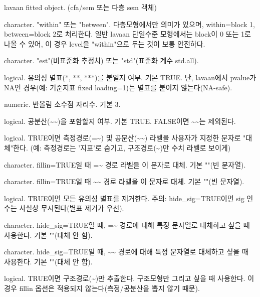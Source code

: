\documentclass[a4paper]{book}
\begin{document}
\begin{Arguments}
\begin{ldescription}
\item[\code{obj}] lavaan fitted object. (cfa/sem 또는 다층 sem 객체)

\item[\code{level}] character. "within" 또는 "between".
다층모형에서만 의미가 있으며, within=block 1, between=block 2로 처리한다.
일반 lavaan 단일수준 모형에서는 block이 0 또는 1로 나올 수 있어,
이 경우 level을 "within"으로 두는 것이 보통 안전하다.

\item[\code{type}] character. "est"(비표준화 추정치) 또는 "std"(표준화 계수 std.all).

\item[\code{sig}] logical. 유의성 별표(*, **, ***)를 붙일지 여부. 기본 TRUE.
단, lavaan에서 pvalue가 NA인 경우(예: 기준지표 fixed loading=1)는
별표를 붙이지 않는다(NA-safe).

\item[\code{digits}] numeric. 반올림 소수점 자리수. 기본 3.

\item[\code{include\_cov}] logical. 공분산(\textasciitilde{}\textasciitilde{})을 포함할지 여부. 기본 TRUE.
FALSE이면 \textasciitilde{}\textasciitilde{}는 제외된다.

\item[\code{fillin}] logical. TRUE이면 측정경로(=\textasciitilde{}) 및 공분산(\textasciitilde{}\textasciitilde{}) 라벨을
사용자가 지정한 문자로 "대체"한다. (예: 측정경로는 '지표'로 숨기고,
구조경로(\textasciitilde{})만 수치 라벨로 보이게)

\item[\code{hide\_mea}] character. fillin=TRUE일 때 =\textasciitilde{} 경로 라벨을 이 문자로 대체.
기본 ""(빈 문자열).

\item[\code{hide\_cov}] character. fillin=TRUE일 때 \textasciitilde{}\textasciitilde{} 경로 라벨을 이 문자로 대체.
기본 ""(빈 문자열).

\item[\code{hide\_sig}] logical. TRUE이면 모든 유의성 별표를 제거한다.
주의: hide\_sig=TRUE이면 sig 인수는 사실상 무시된다(별표 제거가 우선).

\item[\code{hide\_sig\_mea}] character. hide\_sig=TRUE일 때,
=\textasciitilde{} 경로에 대해 특정 문자열로 대체하고 싶을 때 사용한다.
기본 ""(대체 안 함).

\item[\code{hide\_sig\_cov}] character. hide\_sig=TRUE일 때,
\textasciitilde{}\textasciitilde{} 경로에 대해 특정 문자열로 대체하고 싶을 때 사용한다.
기본 ""(대체 안 함).

\item[\code{path\_only}] logical. TRUE이면 구조경로(\textasciitilde{})만 추출한다.
구조모형만 그리고 싶을 때 사용한다.
이 경우 fillin 옵션은 적용되지 않는다(측정/공분산을 뽑지 않기 때문).
\end{ldescription}
\end{Arguments}
\end{document}
